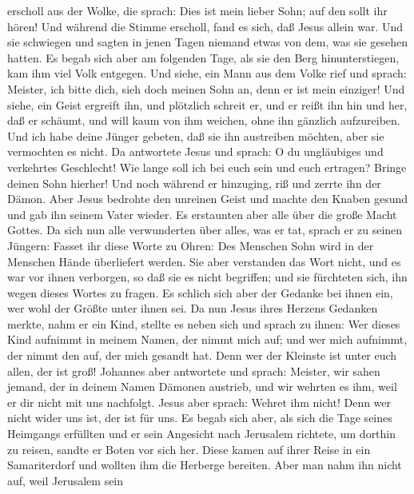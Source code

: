 erscholl aus der Wolke, die sprach: Dies ist mein lieber Sohn; auf den
sollt ihr hören!  Und während die Stimme erscholl, fand
es sich, daß Jesus allein war. Und sie schwiegen und sagten in jenen
Tagen niemand etwas von dem, was sie gesehen hatten.  Es
begab sich aber am folgenden Tage, als sie den Berg hinunterstiegen, kam
ihm viel Volk entgegen.  Und siehe, ein Mann aus dem
Volke rief und sprach: Meister, ich bitte dich, sieh doch meinen Sohn
an, denn er ist mein einziger!  Und siehe, ein Geist
ergreift ihn, und plötzlich schreit er, und er reißt ihn hin und her,
daß er schäumt, und will kaum von ihm weichen, ohne ihn gänzlich
aufzureiben.  Und ich habe deine Jünger gebeten, daß sie
ihn austreiben möchten, aber sie vermochten es nicht.  Da
antwortete Jesus und sprach: O du ungläubiges und verkehrtes Geschlecht!
Wie lange soll ich bei euch sein und euch ertragen? Bringe deinen Sohn
hierher!  Und noch während er hinzuging, riß und zerrte
ihn der Dämon. Aber Jesus bedrohte den unreinen Geist und machte den
Knaben gesund und gab ihn seinem Vater wieder.  Es
erstaunten aber alle über die große Macht Gottes. Da sich nun alle
verwunderten über alles, was er tat, sprach er zu seinen Jüngern:
 Fasset ihr diese Worte zu Ohren: Des Menschen Sohn wird
in der Menschen Hände überliefert werden.  Sie aber
verstanden das Wort nicht, und es war vor ihnen verborgen, so daß sie es
nicht begriffen; und sie fürchteten sich, ihn wegen dieses Wortes zu
fragen.  Es schlich sich aber der Gedanke bei ihnen ein,
wer wohl der Größte unter ihnen sei.  Da nun Jesus ihres
Herzens Gedanken merkte, nahm er ein Kind, stellte es neben sich und
sprach zu ihnen:  Wer dieses Kind aufnimmt in meinem
Namen, der nimmt mich auf; und wer mich aufnimmt, der nimmt den auf, der
mich gesandt hat. Denn wer der Kleinste ist unter euch allen, der ist
groß!  Johannes aber antwortete und sprach: Meister, wir
sahen jemand, der in deinem Namen Dämonen austrieb, und wir wehrten es
ihm, weil er dir nicht mit uns nachfolgt.  Jesus aber
sprach: Wehret ihm nicht! Denn wer nicht wider uns ist, der ist für uns.
 Es begab sich aber, als sich die Tage seines Heimgangs
erfüllten und er sein Angesicht nach Jerusalem richtete, um dorthin zu
reisen,  sandte er Boten vor sich her. Diese kamen auf
ihrer Reise in ein Samariterdorf und wollten ihm die Herberge bereiten.
 Aber man nahm ihn nicht auf, weil Jerusalem sein
